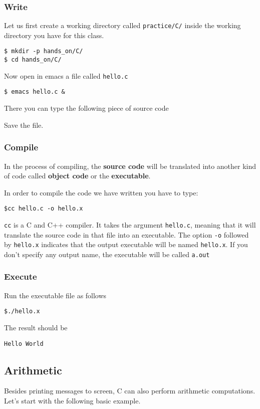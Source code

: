 \documentclass{article}
\begin{document}
\subsubsection{Write}
Let us first create a working directory called \verb"practice/C/" inside the working directory you have for this class.
\begin{verbatim}
$ mkdir -p hands_on/C/
$ cd hands_on/C/
\end{verbatim}

Now open in emacs a file called \verb"hello.c"
\begin{verbatim}
$ emacs hello.c &
\end{verbatim}

There you can type the following piece of source code



Save the file.

\subsubsection{Compile}
In the process of compiling, the {\bf source code} will be translated into another kind of code called {\bf object code} or the {\bf executable}. 

In order to compile the code we have written you have to type:
\begin{verbatim}
$cc hello.c -o hello.x
\end{verbatim}

\verb"cc" is a C and C++ compiler. It takes the argument \verb"hello.c", meaning that it will translate the source code in that file into an executable. The option \verb"-o" followed by \verb"hello.x" indicates that the output executable will be named \verb"hello.x". If you don't specify any output name, the executable will be called \verb"a.out"

\subsubsection{Execute}
Run the executable file as follows
\begin{verbatim}
$./hello.x
\end{verbatim}
The result should be
\begin{verbatim}
Hello World
\end{verbatim}

\subsection{Arithmetic}
Besides printing messages to screen, C can also perform arithmetic computations. Let's start with the following basic example.
\end{document}

